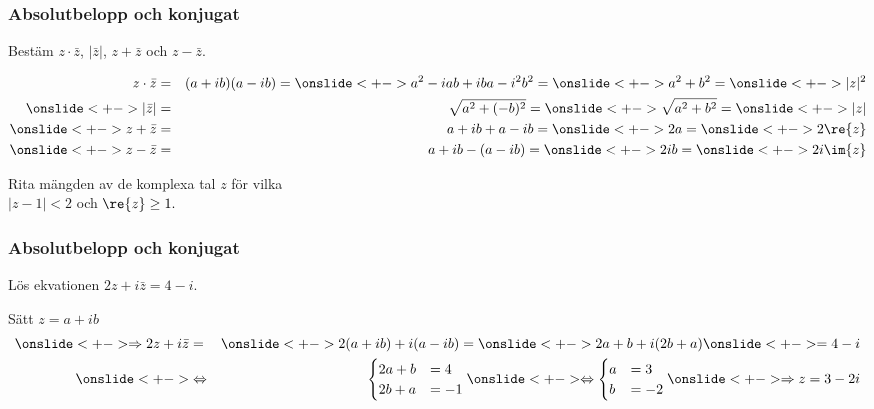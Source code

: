 \documentclass[slidestop,blue,handout,9pt]{beamer}
\begin{document}
\begin{frame}
\frametitle{Absolutbelopp och konjugat}
\begin{exempel}
Bestäm $z\cdot \bar{z}$, $|\bar{z}|$, $z+\bar{z}$ och $z-\bar{z}$.  
\onslide<+->
\begin{losning}
\begin{eqnarray*}
z\cdot\bar{z}   & =& (a + ib)(a - ib) = \onslide<+->
a^2 - iab + iba - i^2b^2 = \onslide<+->
a^2 + b^2 =\onslide<+->|z|^2 \\
\onslide<+->
|\bar{z}|  & = &\sqrt{a^2 + (-b)^2} = \onslide<+->
\sqrt{a^2 + b^2} =\onslide<+->
|z| \\
\onslide<+->
z + \bar{z}& = &a + ib + a - ib = \onslide<+->
2a = \onslide<+-> 2\re{z} \\
\onslide<+->
z - \bar{z}& = &a + ib - (a - ib) =\onslide<+->2ib = \onslide<+->2i\im{z}
\end{eqnarray*}
\end{losning}
\end{exempel}
\begin{exempel}
\begin{minipage}[t]{0.7\linewidth}
Rita mängden av de komplexa tal $z$ för vilka \\
$|z - 1| < 2$
och $\re{z} \geq 1.$
\end{minipage}
\begin{minipage}[t]{0.25\linewidth}
\vspace{-0.3cm}
\onslide<+->
\end{minipage}
\end{exempel}
\end{frame}

\begin{frame}
\frametitle{Absolutbelopp och konjugat}
\begin{exempel}
Lös ekvationen $2z + i\bar{z} = 4 - i$.
\onslide<+->
\begin{losning}
Sätt $z=a + ib$
\begin{eqnarray*}
\onslide<+->
\Rightarrow 2z + i\bar{z} &=& \onslide<+->
2(a + ib) + i(a - ib) = \onslide<+->
2a + b + i(2b + a) \onslide<+->
= 4 - i\\
\onslide<+->
&\Leftrightarrow& 
\begin{cases}
2a + b &=4 \\ 
2b + a &=-1
\end{cases}
\onslide<+->
\Leftrightarrow  
\begin{cases}
a &= 3 \\ 
b &= -2
\end{cases}
\onslide<+->
\Rightarrow z = 3 -2i
\end{eqnarray*}
\end{losning}
\end{exempel}
\end{frame}
\end{document}
